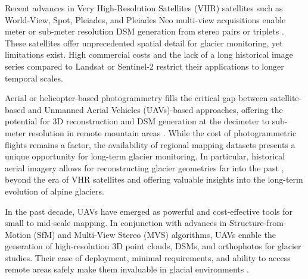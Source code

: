 Recent advances in Very High-Resolution Satellites (VHR) satellites such as World-View, Spot, Pleiades, and Pleiades Neo multi-view acquisitions enable meter or sub-meter resolution DSM generation from stereo pairs or triplets \citep{rupnik2018_VHR, Perko218, Tonolo2020}.
These satellites offer unprecedented spatial detail for glacier monitoring, yet limitations exist.
High commercial costs and the lack of a long historical image series compared to Landsat or Sentinel-2 restrict their applications to longer temporal scales.

Aerial or helicopter-based photogrammetry fills the critical gap between satellite-based and Unmanned Aerial Vehicles (UAVs)-based approaches, offering the potential for 3D reconstruction and DSM generation at the decimeter to sub-meter resolution in remote mountain areas \citep{poli2020use}. 
While the cost of photogrammetric flights remains a factor, the availability of regional mapping datasets presents a unique opportunity for long-term glacier monitoring.
In particular, historical aerial imagery allows for reconstructing glacier geometries far into the past \citep{Degaetani2021}, beyond the era of VHR satellites and offering valuable insights into the long-term evolution of alpine glaciers.

In the past decade, UAVs have emerged as powerful and cost-effective tools for small to mid-scale mapping.
In conjunction with advances in Structure-from-Motion (SfM) \citep{Westoby2012} and Multi-View Stereo (MVS) \citep{Seitz2006} algorithms,  UAVs enable the generation of high-resolution 3D point clouds, DSMs, and orthophotos for glacier studies. 
Their ease of deployment, minimal requirements, and ability to access remote areas safely make them invaluable in glacial environments \citep{immerzeel2014, Chudley2019, ioli2021mid}. 

